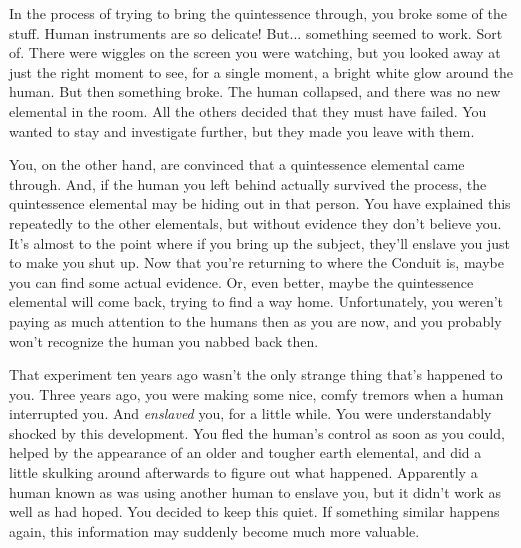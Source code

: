 \documentclass[char]{elementals}
\begin{document}
In the process of trying to bring the quintessence through, you broke some of the stuff.  Human instruments are so delicate!  But... something seemed to work.  Sort of.  There were wiggles on the screen you were watching, but you looked away at just the right moment to see, for a single moment, a bright white glow around the human.  But then something broke.  The human collapsed, and there was no new elemental in the room.  All the others decided that they must have failed.  You wanted to stay and investigate further, but they made you leave with them.

You, on the other hand, are convinced that a quintessence elemental came through.  And, if the human you left behind actually survived the process, the quintessence elemental may be hiding out in that person.  You have explained this repeatedly to the other elementals, but without evidence they don't believe you.  It's almost to the point where if you bring up the subject, they'll enslave you just to make you shut up.  Now that you're returning to where the Conduit is, maybe you can find some actual evidence.  Or, even better, maybe the quintessence elemental will come back, trying to find a way home.  Unfortunately, you weren't paying as much attention to the humans then as you are now, and you probably won't recognize the human you nabbed back then.

That experiment ten years ago wasn't the only strange thing that's happened to you.  Three years ago, you were making some nice, comfy tremors when a human interrupted you.  And {\em enslaved} you, for a little while.  You were understandably shocked by this development.  You fled the human's control as soon as you could, helped by the appearance of an older and tougher earth elemental, and did a little skulking around afterwards to figure out what happened.  Apparently a human known as \cMS{\intro} was using another human to enslave you, but it didn't work as well as \cMS{\they} had hoped.  You decided to keep this quiet.  If something similar happens again, this information may suddenly become much more valuable.
\end{document}
